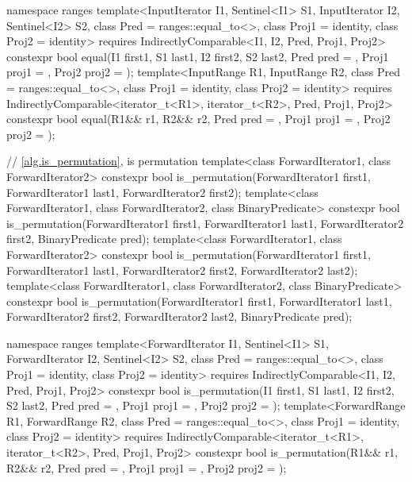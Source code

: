 \begin{codeblock}
{  namespace ranges {
    template<InputIterator I1, Sentinel<I1> S1, InputIterator I2, Sentinel<I2> S2,
             class Pred = ranges::equal_to<>, class Proj1 = identity, class Proj2 = identity>
      requires IndirectlyComparable<I1, I2, Pred, Proj1, Proj2>
      constexpr bool equal(I1 first1, S1 last1, I2 first2, S2 last2,
                           Pred pred = {},
                           Proj1 proj1 = {}, Proj2 proj2 = {});
    template<InputRange R1, InputRange R2, class Pred = ranges::equal_to<>,
             class Proj1 = identity, class Proj2 = identity>
      requires IndirectlyComparable<iterator_t<R1>, iterator_t<R2>, Pred, Proj1, Proj2>
      constexpr bool equal(R1&& r1, R2&& r2, Pred pred = {},
                           Proj1 proj1 = {}, Proj2 proj2 = {});
  }

  // \ref{alg.is_permutation}, is permutation
  template<class ForwardIterator1, class ForwardIterator2>
    constexpr bool is_permutation(ForwardIterator1 first1, ForwardIterator1 last1,
                                  ForwardIterator2 first2);
  template<class ForwardIterator1, class ForwardIterator2, class BinaryPredicate>
    constexpr bool is_permutation(ForwardIterator1 first1, ForwardIterator1 last1,
                                  ForwardIterator2 first2, BinaryPredicate pred);
  template<class ForwardIterator1, class ForwardIterator2>
    constexpr bool is_permutation(ForwardIterator1 first1, ForwardIterator1 last1,
                                  ForwardIterator2 first2, ForwardIterator2 last2);
  template<class ForwardIterator1, class ForwardIterator2, class BinaryPredicate>
    constexpr bool is_permutation(ForwardIterator1 first1, ForwardIterator1 last1,
                                  ForwardIterator2 first2, ForwardIterator2 last2,
                                  BinaryPredicate pred);

  namespace ranges {
    template<ForwardIterator I1, Sentinel<I1> S1, ForwardIterator I2,
             Sentinel<I2> S2, class Pred = ranges::equal_to<>, class Proj1 = identity,
             class Proj2 = identity>
      requires IndirectlyComparable<I1, I2, Pred, Proj1, Proj2>
      constexpr bool is_permutation(I1 first1, S1 last1, I2 first2, S2 last2,
                                    Pred pred = {},
                                    Proj1 proj1 = {}, Proj2 proj2 = {});
    template<ForwardRange R1, ForwardRange R2, class Pred = ranges::equal_to<>,
             class Proj1 = identity, class Proj2 = identity>
      requires IndirectlyComparable<iterator_t<R1>, iterator_t<R2>, Pred, Proj1, Proj2>
      constexpr bool is_permutation(R1&& r1, R2&& r2, Pred pred = {},
                                    Proj1 proj1 = {}, Proj2 proj2 = {});
  }

}
\end{codeblock}
